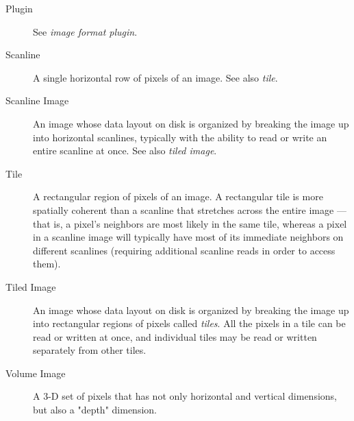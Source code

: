 \begin{description}
\item[Plugin] See \emph{image format plugin}.

\item[Scanline] A single horizontal row of pixels of an image.  See also
  \emph{tile}.

\item[Scanline Image] An image whose data layout on disk is organized by
  breaking the image up into horizontal scanlines, typically with the
  ability to read or write an entire scanline at once.  See also
  \emph{tiled image}.

\item[Tile] A rectangular region of pixels of an image.  A rectangular
  tile is more spatially coherent than a scanline that stretches across
  the entire image --- that is, a pixel's neighbors are most likely in
  the same tile, whereas a pixel in a scanline image will typically have
  most of its immediate neighbors on different scanlines (requiring
  additional scanline reads in order to access them).

\item[Tiled Image] An image whose data layout on disk is organized by
  breaking the image up into rectangular regions of pixels called
  \emph{tiles}.  All the pixels in a tile can be read or written at
  once, and individual tiles may be read or written separately from
  other tiles.

\item[Volume Image] A 3-D set of pixels that has not only horizontal and
  vertical dimensions, but also a "depth" dimension.

\end{description}

\chapwidthend
